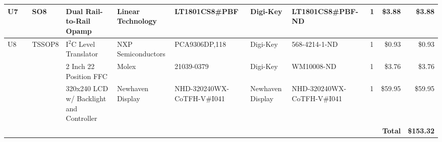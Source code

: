 \documentclass{article}
\begin{document}
\begin{center}
\begin{tabular}{| l | l | l | l | l | l | l | l | l | r | r |}
      \hline
      U7                      &                  &  SO8               &  Dual Rail-to-Rail Opamp                  &  Linear Technology      &  LT1801CS8\#PBF                 &  Digi-Key           &  LT1801CS8\#PBF-ND           &  1             &  \$3.88              &  \$3.88 \\
      \hline
      U8                      &                  &  TSSOP8            &  I$^2$C Level Translator                  &  NXP Semiconductors     &  PCA9306DP,118                  &  Digi-Key           &  568-4214-1-ND               &  1             &  \$0.93              &  \$0.93 \\
      \hline
                              &                  &                    &  2 Inch 22 Position FFC                   &  Molex                  &  21039-0379                     &  Digi-Key           &  WM10008-ND                  &  1             &  \$3.76              &  \$3.76 \\
      \hline
                              &                  &                    &  320x240 LCD w/ Backlight and Controller  &  Newhaven Display       &  NHD-320240WX-CoTFH-V\#I041     &  Newhaven Display   &  NHD-320240WX-CoTFH-V\#I041  &  1             &  \$59.95             &  \$59.95 \\
      \hline
                              &                  &                    &                                           &                         &                                 &                     &                              &                & \textbf{Total}       &  \textbf{\$153.32} \\
      \hline
    \end{tabular}
  \end{center}
\end{document}

